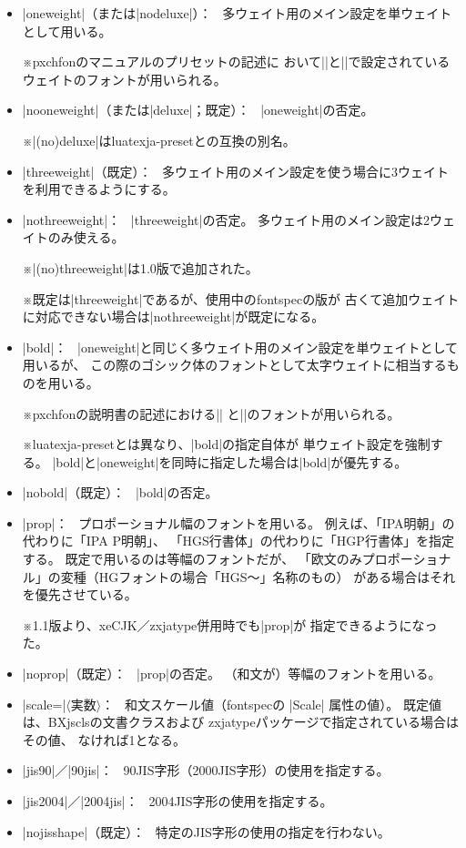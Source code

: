 \documentclass[xelatex,ja=standard,jafont=ipaex,
  a4paper]{bxjsarticle}
\newcommand{\Pkg}[1]{\textsf{#1}}
\newcommand{\Meta}[1]{$\langle$\mbox{}#1\mbox{}$\rangle$}
\newcommand{\Note}{\par\noindent ※}
\newcommand{\Means}{：\ }
\newcommand{\JSl}{\mbox{／}\linebreak[0]}
\begin{document}
\begin{itemize}
\item |oneweight|（または|nodeluxe|）\Means
多ウェイト用のメイン設定を単ウェイトとして用いる。
\Note \Pkg{pxchfon}のマニュアルのプリセットの記述に
おいて\>|\setminchofont|\>と\>|\setgothicfont|\>で設定されている
ウェイトのフォントが用いられる。
\item |nooneweight|（または|deluxe|；既定）\Means
|oneweight|\>の否定。
\Note |(no)deluxe|\>は\Pkg{luatexja-preset}との互換の別名。

\item |threeweight|（既定）\Means
多ウェイト用のメイン設定を使う場合に3ウェイトを利用できるようにする。
\item |nothreeweight|\Means
|threeweight|\>の否定。
多ウェイト用のメイン設定は2ウェイトのみ使える。
\Note |(no)threeweight|\>は1.0版で追加された。
\Note 既定は\>|threeweight|\>であるが、使用中の\Pkg{fontspec}の版が
古くて追加ウェイトに対応できない場合は\>|nothreeweight|\>が既定になる。

\item |bold|\Means
|oneweight|\>と同じく多ウェイト用のメイン設定を単ウェイトとして用いるが、
この際のゴシック体のフォントとして太字ウェイトに相当するものを用いる。
\Note \Pkg{pxchfon}の説明書の記述における\>|\setminchofont|\>%
と\>|\setboldgothicfont|\>のフォントが用いられる。
\Note \Pkg{luatexja-preset}とは異なり、|bold|\>の指定自体が
単ウェイト設定を強制する。
|bold|\>と\>|oneweight|\>を同時に指定した場合は\>|bold|\>が優先する。
\item |nobold|（既定）\Means
|bold|\>の否定。

\item |prop|\Means
プロポーショナル幅のフォントを用いる。
例えば、「IPA明朝」の代わりに「IPA P明朝」、
「HGS行書体」の代わりに「HGP行書体」を指定する。
既定で用いるのは等幅のフォントだが、
「欧文のみプロポーショナル」の変種（HGフォントの場合「HGS～」名称のもの）
がある場合はそれを優先させている。
\Note 1.1版より、\Pkg{xeCJK}\JSl\Pkg{zxjatype}併用時でも\>|prop|\>が
指定できるようになった。
\item |noprop|（既定）\Means
|prop|\>の否定。
（和文が）等幅のフォントを用いる。

\item |scale=|\Meta{実数}\Means
和文スケール値（\Pkg{fontspec}の |Scale| 属性の値）。
既定値は、\Pkg{BXjscls}の文書クラスおよび
\Pkg{zxjatype}パッケージで指定されている場合はその値、
なければ1となる。

\item |jis90|\JSl|90jis|\Means
90JIS字形（2000JIS字形）の使用を指定する。
\item |jis2004|\JSl|2004jis|\Means
2004JIS字形の使用を指定する。
\item |nojisshape|（既定）\Means
特定のJIS字形の使用の指定を行わない。


\end{itemize}
\end{document}
